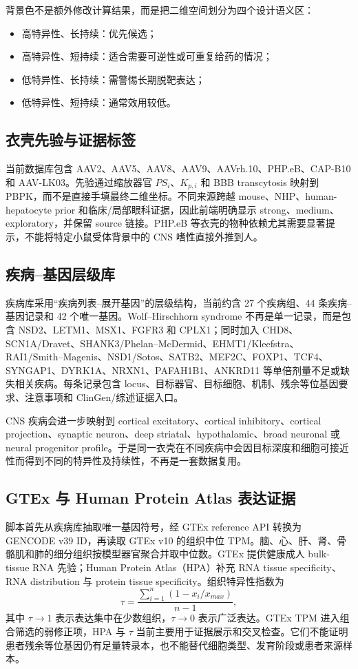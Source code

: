\documentclass[UTF8,11pt,a4paper]{ctexart}
\begin{document}
背景色不是额外修改计算结果，而是把二维空间划分为四个设计语义区：
\begin{itemize}
  \item 高特异性、长持续：优先候选；
  \item 高特异性、短持续：适合需要可逆性或可重复给药的情况；
  \item 低特异性、长持续：需警惕长期脱靶表达；
  \item 低特异性、短持续：通常效用较低。
\end{itemize}

\subsection{衣壳先验与证据标签}
当前数据库包含 AAV2、AAV5、AAV8、AAV9、AAVrh.10、PHP.eB、CAP-B10 和 AAV-LK03。先验通过缩放器官 $PS_i$、$K_{p,i}$ 和 BBB transcytosis 映射到 PBPK，而不是直接手填最终二维坐标。不同来源跨越 mouse、NHP、human-hepatocyte prior 和临床/局部眼科证据，因此前端明确显示 strong、medium、exploratory，并保留 source 链接。PHP.eB 等衣壳的物种依赖尤其需要显著提示，不能将特定小鼠受体背景中的 CNS 嗜性直接外推到人。

\subsection{疾病--基因层级库}
疾病库采用“疾病列表--展开基因”的层级结构，当前约含 27 个疾病组、44 条疾病--基因记录和 42 个唯一基因。Wolf--Hirschhorn syndrome 不再是单一记录，而是包含 NSD2、LETM1、MSX1、FGFR3 和 CPLX1；同时加入 CHD8、SCN1A/Dravet、SHANK3/Phelan--McDermid、EHMT1/Kleefstra、RAI1/Smith--Magenis、NSD1/Sotos、SATB2、MEF2C、FOXP1、TCF4、SYNGAP1、DYRK1A、NRXN1、PAFAH1B1、ANKRD11 等单倍剂量不足或缺失相关疾病。每条记录包含 locus、目标器官、目标细胞、机制、残余等位基因要求、注意事项和 ClinGen/综述证据入口。

CNS 疾病会进一步映射到 cortical excitatory、cortical inhibitory、cortical projection、synaptic neuron、deep striatal、hypothalamic、broad neuronal 或 neural progenitor profile。于是同一衣壳在不同疾病中会因目标深度和细胞可接近性而得到不同的特异性及持续性，不再是一套数据复用。

\subsection{GTEx 与 Human Protein Atlas 表达证据}
脚本首先从疾病库抽取唯一基因符号，经 GTEx reference API 转换为 GENCODE v39 ID，再读取 GTEx v10 的组织中位 TPM。脑、心、肝、肾、骨骼肌和肺的细分组织按模型器官聚合并取中位数。GTEx 提供健康成人 bulk-tissue RNA 先验\cite{gtex2020}；Human Protein Atlas（HPA）补充 RNA tissue specificity、RNA distribution 与 protein tissue specificity\cite{hpa2015}。组织特异性指数为
\begin{equation}
\tau=\frac{\sum_{i=1}^{n}(1-x_i/x_{max})}{n-1},
\end{equation}
其中 $\tau\to1$ 表示表达集中在少数组织，$\tau\to0$ 表示广泛表达。GTEx TPM 进入组合筛选的弱修正项，HPA 与 $\tau$ 当前主要用于证据展示和交叉检查。它们不能证明患者残余等位基因仍有足量转录本，也不能替代细胞类型、发育阶段或患者来源样本。
\end{document}
